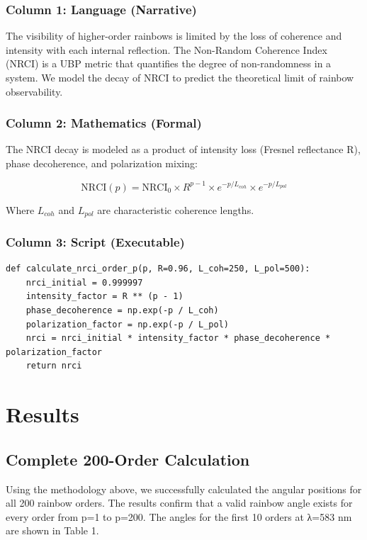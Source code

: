 \documentclass[12pt]{article}
\begin{document}
\subsubsection{Column 1: Language (Narrative)}
The visibility of higher-order rainbows is limited by the loss of coherence and intensity with each internal reflection. The Non-Random Coherence Index (NRCI) is a UBP metric that quantifies the degree of non-randomness in a system. We model the decay of NRCI to predict the theoretical limit of rainbow observability.

\subsubsection{Column 2: Mathematics (Formal)}
The NRCI decay is modeled as a product of intensity loss (Fresnel reflectance R), phase decoherence, and polarization mixing:

\begin{equation}
\text{NRCI}(p) = \text{NRCI}_0 \times R^{p-1} \times e^{-p/L_{coh}} \times e^{-p/L_{pol}}
\end{equation}

Where $L_{coh}$ and $L_{pol}$ are characteristic coherence lengths.

\subsubsection{Column 3: Script (Executable)}

\begin{verbatim}
def calculate_nrci_order_p(p, R=0.96, L_coh=250, L_pol=500):
    nrci_initial = 0.999997
    intensity_factor = R ** (p - 1)
    phase_decoherence = np.exp(-p / L_coh)
    polarization_factor = np.exp(-p / L_pol)
    nrci = nrci_initial * intensity_factor * phase_decoherence * polarization_factor
    return nrci
\end{verbatim}

\section{Results}

\subsection{Complete 200-Order Calculation}
Using the methodology above, we successfully calculated the angular positions for all 200 rainbow orders. The results confirm that a valid rainbow angle exists for every order from p=1 to p=200. The angles for the first 10 orders at λ=583 nm are shown in Table 1.
\end{document}
